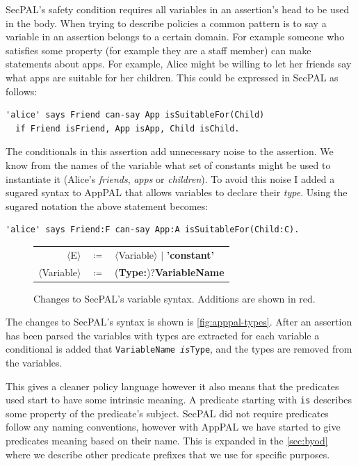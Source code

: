\documentclass[a4paper]{scrartcl}
\newcommand{\new}[1]{{\color{BrickRed}#1}}
\begin{document}
SecPAL's safety condition requires all variables in an assertion's head to be
used in the body. When trying to describe policies a common pattern is to say a
variable in an assertion belongs to a certain domain. For example someone who
satisfies some property (for example they are a staff member) can make
statements about apps.
For example, Alice might be willing to let her friends say what apps are
suitable for her children.  This could be expressed in SecPAL as follows:

\begin{lstlisting}
'alice' says Friend can-say App isSuitableFor(Child)
  if Friend isFriend, App isApp, Child isChild.
\end{lstlisting}

The conditionals in this assertion add unnecessary noise to the assertion. We
know from the names of the variable what set of constants might be used
to instantiate it (Alice's \emph{friends}, \emph{apps} or \emph{children}). To
avoid this noise I added a sugared syntax to AppPAL that allows variables to
declare their \emph{type}. Using the sugared notation the above statement
becomes:

\begin{lstlisting}
'alice' says Friend:F can-say App:A isSuitableFor(Child:C).
\end{lstlisting}

\begin{figure}
  \newcommand{\nonterminal}[1]{$\langle$#1$\rangle$}
  \newcommand{\terminal}[1]{\textbf{#1}}
  \begin{tabular}{r c l}
    \footnotesize
    \nonterminal{E}         & $\coloneqq$ & \nonterminal{Variable} $\vert$ \terminal{'constant'} \\
    \nonterminal{Variable}  & $\coloneqq$ & \new{(\terminal{Type}\terminal{:})?}\terminal{VariableName}
  \end{tabular}
  \caption{Changes to SecPAL's variable syntax.  Additions are shown in \new{red}.}
  \label{fig:apppal-types}
\end{figure}
The changes to SecPAL's syntax is shown is \autoref{fig:apppal-types}.
After an assertion has been parsed the variables with types are extracted for
each variable a conditional is added that \texttt{VariableName \emph{is}Type},
and the types are removed from the variables.

This gives a cleaner policy language however it also means that the predicates
used start to have some intrinsic meaning.  A predicate starting with
\texttt{is} describes some property of the predicate's subject.
SecPAL did not require predicates follow any naming conventions, however with
AppPAL we have started to give predicates meaning based on their name.
This is expanded in the \autoref{sec:byod} where we describe other predicate
prefixes that we use for specific purposes.
\end{document}

